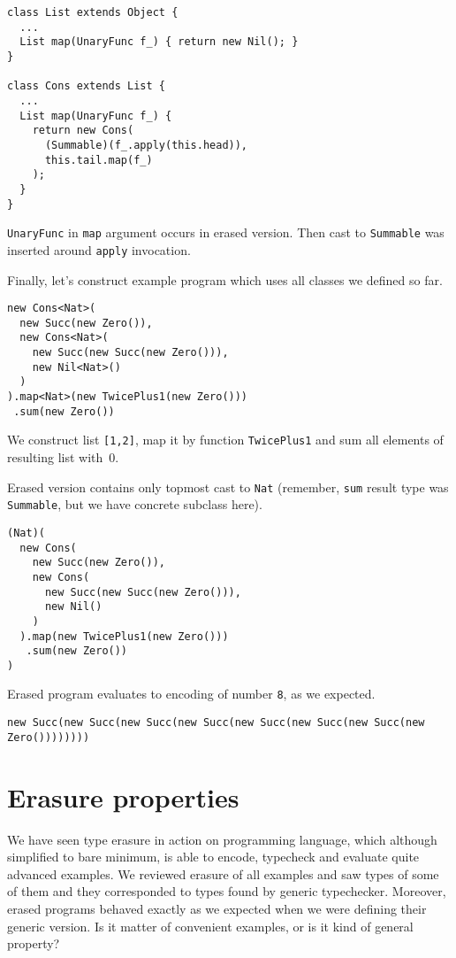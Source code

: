 \documentclass{article}[12pt]
\begin{document}
\begin{verbatim}
class List extends Object {
  ...
  List map(UnaryFunc f_) { return new Nil(); }
}

class Cons extends List {
  ...
  List map(UnaryFunc f_) {
    return new Cons(
      (Summable)(f_.apply(this.head)),
      this.tail.map(f_)
    );     
  }
}
\end{verbatim}

\texttt{UnaryFunc} in \texttt{map} argument occurs in erased
version. Then cast to \texttt{Summable} was inserted around
\texttt{apply} invocation.

Finally, let's construct example program which uses all classes
we defined so far.

\begin{verbatim}
new Cons<Nat>(
  new Succ(new Zero()),
  new Cons<Nat>(
    new Succ(new Succ(new Zero())),
    new Nil<Nat>()
  )
).map<Nat>(new TwicePlus1(new Zero()))
 .sum(new Zero())
\end{verbatim}

We construct list \texttt{[1,2]}, map it by function
\texttt{TwicePlus1} and sum all elements of resulting list
with~0.

Erased version contains only topmost cast to \texttt{Nat}
(remember, \texttt{sum} result type was \texttt{Summable},
but we have concrete subclass here).

\begin{verbatim}
(Nat)(
  new Cons(
    new Succ(new Zero()),
    new Cons(
      new Succ(new Succ(new Zero())),
      new Nil()
    )
  ).map(new TwicePlus1(new Zero()))
   .sum(new Zero())
)
\end{verbatim}

Erased program evaluates to encoding of number \texttt{8},
as we expected.

\begin{verbatim}
new Succ(new Succ(new Succ(new Succ(new Succ(new Succ(new Succ(new Zero())))))))
\end{verbatim}


\section{Erasure properties}

We have seen type erasure in action on programming language,
which although simplified to bare minimum, is able to encode,
typecheck and evaluate quite advanced examples. We reviewed
erasure of all examples and saw types of some of them and
they corresponded to types found by generic typechecker. Moreover,
erased programs behaved exactly as we expected when we were
defining their generic version. Is it matter of convenient
examples, or is it kind of general property?
\end{document}
